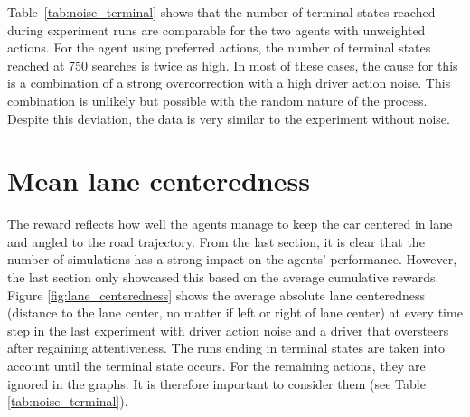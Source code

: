 Table~\ref{tab:noise_terminal} shows that the number of terminal states reached during experiment runs are comparable for the two agents with unweighted actions. For the agent using preferred actions, the number of terminal states reached at 750 searches is twice as high. In most of these cases, the cause for this is a combination of a strong overcorrection with a high driver action noise. This combination is unlikely but possible with the random nature of the process. Despite this deviation, the data is very similar to the experiment without noise.






\section{Mean lane centeredness}
\label{sec:centeredness}


The reward reflects how well the agents manage to keep the car centered in lane and angled to the road trajectory. From the last section, it is clear that the number of simulations has a strong impact on the agents' performance. However, the last section only showcased this based on the average cumulative rewards. Figure \ref{fig:lane_centeredness} shows the average absolute lane centeredness (distance to the lane center, no matter if left or right of lane center) at every time step in the last experiment with driver action noise and a driver that oversteers after regaining attentiveness. The runs ending in terminal states are taken into account until the terminal state occurs. For the remaining actions, they are ignored in the graphs. It is therefore important to consider them (see Table \ref{tab:noise_terminal}). 

